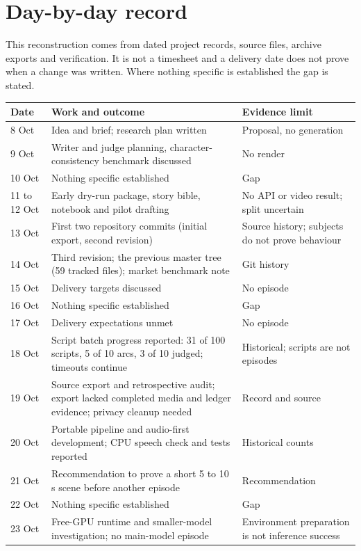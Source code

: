 \documentclass[11pt,a4paper]{article}
\begin{document}
\section{Day-by-day record}
\label{sec:daily}
This reconstruction comes from dated project records, source files, archive exports and verification. It is not a timesheet and a delivery date does not prove when a change was written. Where nothing specific is established the gap is stated.
\begin{longtable}{@{}P{1.8cm}P{8.2cm}P{5.5cm}@{}}
\toprule \textbf{Date} & \textbf{Work and outcome} & \textbf{Evidence limit}\\ \midrule{} Oct & Idea and brief; research plan written & Proposal, no generation\\
9 Oct & Writer and judge planning, character-consistency benchmark discussed & No render\\
10 Oct & Nothing specific established & Gap\\
11 to 12 Oct & Early dry-run package, story bible, notebook and pilot drafting & No API or video result; split uncertain\\
13 Oct & First two repository commits (initial export, second revision) & Source history; subjects do not prove behaviour\\
14 Oct & Third revision; the previous master tree (59 tracked files); market benchmark note & Git history\\
15 Oct & Delivery targets discussed & No episode\\
16 Oct & Nothing specific established & Gap\\
17 Oct & Delivery expectations unmet & No episode\\
18 Oct & Script batch progress reported: 31 of 100 scripts, 5 of 10 arcs, 3 of 10 judged; timeouts continue & Historical; scripts are not episodes\\
19 Oct & Source export and retrospective audit; export lacked completed media and ledger evidence; privacy cleanup needed & Record and source\\
20 Oct & Portable pipeline and audio-first development; CPU speech check and tests reported & Historical counts\\
21 Oct & Recommendation to prove a short 5 to 10 s scene before another episode & Recommendation\\
22 Oct & Nothing specific established & Gap\\
23 Oct & Free-GPU runtime and smaller-model investigation; no main-model episode & Environment preparation is not inference success\\

\end{longtable}
\end{document}
